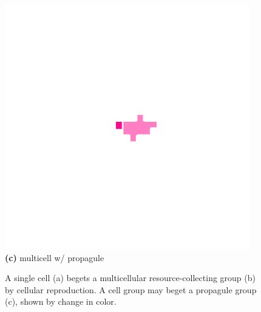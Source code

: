 \begin{figure}
\begin{columns}
\begin{column}{0.20\textwidth}
    \includegraphics[width=\textwidth,trim={300 300 250 300},clip]{img/lifecycle-3}\\
    \footnotesize \textbf{(c)} multicell w/ propagule
\end{column}
\begin{column}{0.2\textwidth}
\caption{
A single cell (a) begets a multicellular resource-collecting group (b) by cellular reproduction.
A cell group may beget a propagule group (c), shown by change in color.
}
\label{fig:lifecycle}
\end{column}
\end{columns}
\end{figure}

